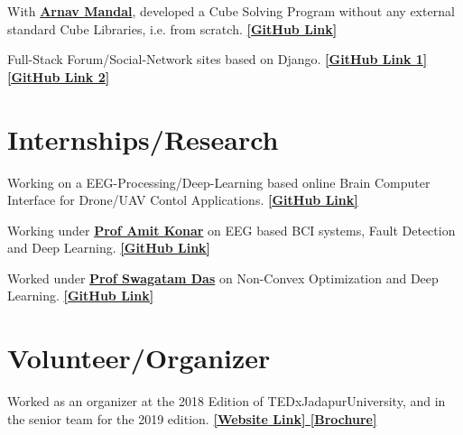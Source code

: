 \documentclass[]{deedy-resume-openfont}
\begin{document}
\begin{minipage}[t]{0.66\textwidth}
With \textbf{\href{https://github.com/arnav-mandal1234}{Arnav Mandal}}, developed a Cube Solving Program without any external standard Cube Libraries, i.e. from scratch. \textbf{\href{https://github.com/AyanSinhaMahapatra/CubeSolving}{ [GitHub Link] }}
\sectionsep

Full-Stack Forum/Social-Network sites based on Django.
\textbf{\href{https://github.com/AyanSinhaMahapatra/Univnet_Beta}{ [GitHub Link 1] }} \textbf{\href{https://github.com/AyanSinhaMahapatra/AnswerIt}{ [GitHub Link 2] }}
\sectionsep


\section{Internships/Research}
Working on a EEG-Processing/Deep-Learning based online Brain Computer Interface for Drone/UAV Contol Applications. 
\textbf{\href{https://github.com/AyanSinhaMahapatra/bci-nal}{ [GitHub Link] }}
\sectionsep

Working under \textbf{\href{https://www.amitkonar.com/}{Prof Amit Konar}} on EEG based BCI systems, Fault Detection and Deep Learning.  
\textbf{\href{https://github.com/AyanSinhaMahapatra/FaultDetectionProjects}{ [GitHub Link] }}
\sectionsep

Worked under \textbf{\href{https://www.isical.ac.in/~swagatam.das/}{Prof Swagatam Das}} on Non-Convex Optimization and Deep Learning.
\textbf{\href{https://github.com/AyanSinhaMahapatra/Gene_Algos}{ [GitHub Link] }}


\section{Volunteer/Organizer}
Worked as an organizer at the 2018 Edition of TEDxJadapurUniversity, and in the senior team for the 2019 edition.  
\textbf{\href{https://tedxjadavpuruniversity.com/}{ [Website Link] }}
\textbf{\href{https://tedxjadavpuruniversity.com/assets/Brochure.pdf}{ [Brochure] }}
\sectionsep

\end{minipage} 
\end{document}
